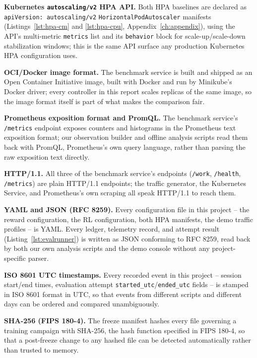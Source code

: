 \textbf{Kubernetes \texttt{autoscaling/v2} HPA API.} Both HPA baselines are
declared as \texttt{apiVersion: autoscaling/v2} \texttt{HorizontalPod\allowbreak Autoscaler}
manifests (Listings~\ref{lst:hpa-cm} and \ref{lst:hpa-cpu}, Appendix~\ref{ch:appendix}), using the
API's multi-metric \texttt{metrics} list and its \texttt{behavior} block for
scale-up/scale-down stabilization windows; this is the same API surface any
production Kubernetes HPA configuration uses.

\textbf{OCI/Docker image format.} The benchmark service is built and
shipped as an Open Container Initiative image, built with Docker and run by
Minikube's Docker driver; every controller in this report scales replicas
of the same image, so the image format itself is part of what makes the
comparison fair.

\textbf{Prometheus exposition format and PromQL.} The benchmark service's
\texttt{/\allowbreak \allowbreak metrics} endpoint exposes counters and histograms in the
Prometheus text exposition format; our observation builder and offline
analysis scripts read them back with PromQL, Prometheus's own query
language, rather than parsing the raw exposition text directly.

\textbf{HTTP/1.1.} All three of the benchmark service's endpoints
(\texttt{/\allowbreak \allowbreak work}, \texttt{/\allowbreak \allowbreak health}, \texttt{/\allowbreak \allowbreak metrics}) are plain
HTTP/1.1 endpoints; the traffic generator, the Kubernetes Service, and
Prometheus's own scraping all speak HTTP/1.1 to reach them.

\textbf{YAML and JSON (RFC 8259).} Every configuration file in this project
-- the reward configuration, the RL configuration, both HPA manifests, the
demo traffic profiles -- is YAML. Every ledger, telemetry record, and
attempt result (Listing~\ref{lst:evalrunner}) is written as JSON conforming
to RFC 8259, read back by both our own analysis scripts and the demo
console without any project-specific parser.

\textbf{ISO 8601 UTC timestamps.} Every recorded event in this project --
session start/end times, evaluation attempt \texttt{started\_\allowbreak utc}/\texttt{ended\_\allowbreak utc}
fields -- is stamped in ISO 8601 format in UTC, so that events from
different scripts and different days can be ordered and compared
unambiguously.

\textbf{SHA-256 (FIPS 180-4).} The freeze manifest hashes every file
governing a training campaign with SHA-256, the hash function specified in
FIPS 180-4, so that a post-freeze change to any hashed file can be detected
automatically rather than trusted to memory.

